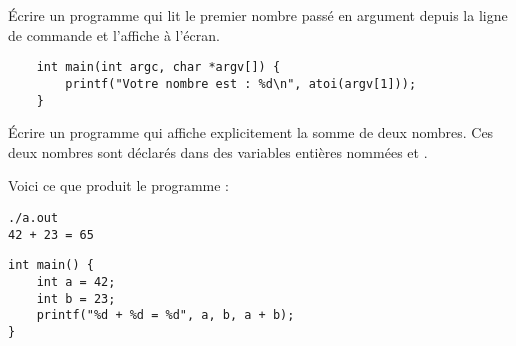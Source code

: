 \documentclass[french,a4paper,addpoints,11pt]{exam}
\begin{document}
\begin{questions}

\question Écrire un programme qui lit le premier nombre passé en argument depuis la ligne de commande et l'affiche à l'écran.

\ifprintanswers
\begin{solution}
    \begin{lstlisting}
    int main(int argc, char *argv[]) {
        printf("Votre nombre est : %d\n", atoi(argv[1]));
    }
    \end{lstlisting}
\end{solution}
\else
\fillwithdottedlines{4cm}
\fi

\question Écrire un programme qui affiche explicitement la somme de deux nombres.
Ces deux nombres sont déclarés dans des variables entières nommées  et .

Voici ce que produit le programme :

\begin{lstlisting}
./a.out
42 + 23 = 65
\end{lstlisting}

\ifprintanswers
\begin{solution}
\begin{lstlisting}
int main() {
    int a = 42;
    int b = 23;
    printf("%d + %d = %d", a, b, a + b);
}
\end{lstlisting}
\end{solution}
\else
\fillwithdottedlines{4cm}
\fi

\end{questions}
\end{document}
